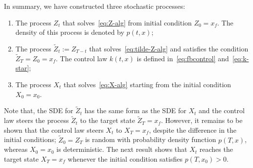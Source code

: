 \documentclass[letterpaper, 10 pt, conference]{ieeeconf}  %
\def\R{\mathbb{R}}
\def\R{\mathbb{R}}
\begin{document}
In summary, we have constructed three stochastic processes: 
\begin{enumerate}
    \item The process $Z_t$ that solves~\eqref{eq:Z-alg} from initial condition $Z_0=x_f$. The density of this process is denoted by $p(t,x)$;
    \item The process $\tilde Z_t := Z_{T-t}$ that solves~\eqref{eq:tilde-Z-alg} and satisfies the condition $\tilde Z_T=Z_0=x_f$. The control law $k(t,x)$ is defined in~\eqref{eq:fbcontrol} and~\eqref{eq:k-star};
    \item The process $X_t$ that solves~\eqref{eq:X-alg} starting from the initial condition $X_0=x_0$.   
\end{enumerate}
Note that, the SDE for $\tilde Z_t$ has the same form as the SDE for $X_t$ and the control law steers the process $\tilde Z_t$ to the target state $\tilde Z_T=x_f$. However, it remains to be shown that the control law steers $X_t$ to $X_T=x_f$, despite the difference in the initial conditions; $\tilde Z_0 = Z_T$ is random with probability density function $p(T,x)$, whereas $X_0=x_0$ is deterministic. The next result shows that $X_t$ reaches the target state $X_T=x_f$  whenever the initial condition satisfies $p(T,x_0)>0$.  




\end{document}
